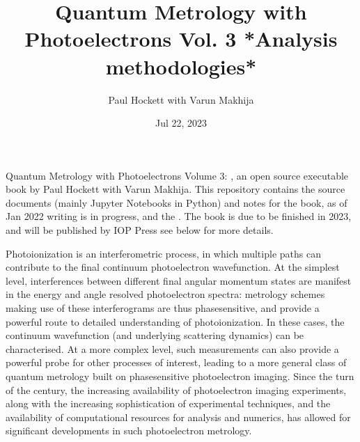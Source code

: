 \documentclass[letterpaper,table,10pt,english]{jupyterBook}
\title{Quantum Metrology with Photoelectrons Vol. 3 *Analysis methodologies*}
\date{Jul 22, 2023}
\author{Paul Hockett with Varun Makhija}
\begin{document}
\pagestyle{empty}
\sphinxmaketitle
\pagestyle{plain}
\sphinxtableofcontents
\pagestyle{normal}
\label{\detokenize{intro::doc}}


\sphinxAtStartPar
Quantum Metrology with Photoelectrons Volume 3: , an open source executable book by Paul Hockett with Varun Makhija. This repository contains the source documents (mainly Jupyter Notebooks in Python) and notes for the book, as of Jan 2022 writing is in progress, and the . The book is due to be finished in 2023, and will be published by IOP Press \sphinxhyphen{} see below for more details.

\begin{DUlineblock}{0em}
\item[] 
\end{DUlineblock}

\sphinxAtStartPar
Photoionization is an interferometric process, in which multiple paths can contribute to the final continuum photoelectron wavefunction. At the simplest level, interferences between different final angular momentum states are manifest in the energy and angle resolved photoelectron spectra: metrology schemes making use of these interferograms are thus phase\sphinxhyphen{}sensitive, and provide a powerful route to detailed understanding of photoionization. In these cases, the continuum wavefunction (and underlying scattering dynamics) can be characterised. At a more complex level, such measurements can also provide a powerful probe for other processes of interest, leading to a more general class of quantum metrology built on phase\sphinxhyphen{}sensitive photoelectron imaging.  Since the turn of the century, the increasing availability of photoelectron imaging experiments, along with the increasing sophistication of experimental techniques, and the availability of computational resources for analysis and numerics, has allowed for significant developments in such photoelectron metrology.

\begin{DUlineblock}{0em}
\item[] 
\end{DUlineblock}
\end{document}

